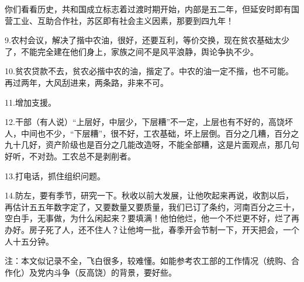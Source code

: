 你们看看历史，共和国成立标志着过渡时期开始，内部是五二年，但延安时即有国营工业、互助合作社，苏区即有社会主义因素，那要到四九年！

9.农村会议，解决了揩中农油，很好，还要互利，等价交换，现在贫农基础太少了，不能完全建在他们身上，家族之间不是风平浪静，舆论争执不少。

10.贫农贷款不去，贫农必揩中农的油，揩定了。中农的油一定不揩，也不可能。再过两年，大风刮进来，两条路，非来不可。

11.增加支援。

12.干部（有人说）“上层好，中层少，下层糟”不一定，上层也有不好的，高饶坏人，中间也不少，“下层糟”，很不好，工农基础，坏上层倒。百分之几糟，百分之九十几好，资产阶级也是百分之几能改造呀，不能全部糟，这是片面观点，那几句好听，不对劲。工农总不是剥削者。

13.打电话，抓住组织问题。

14.防左，要有季节，研究一下。秋收以前大发展，让他吹起来再说，收割以后，再估计五五年数字定了，又要数量又要质量，我们已订了条约，河南百分之三十，空白手，无事做，为什么闲起来？要填满！他怕他烂，他一个不烂更不好，烂了再办好。房子死了人，还不住人？让他垮一批，春季开会节制一下，开天把会，一个人十五分钟。

注：本文似记录不全，飞白很多，较难懂。如能参考农工部的工作情况（统购、合作化）及党内斗争（反高饶）的背景，要好些。


